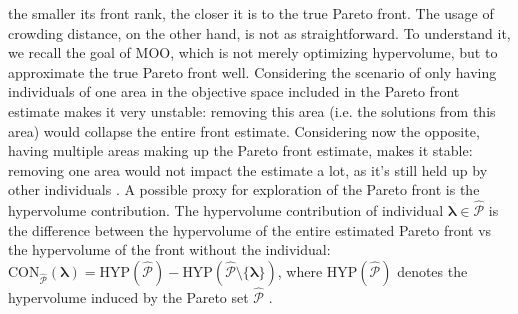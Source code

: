 \documentclass[twoside,11pt]{article}
\begin{document}
the smaller its front rank, the closer it is to the true Pareto front.
The usage of crowding distance, on the other hand, is not as straightforward. To understand it, we recall the goal of MOO, which is not merely optimizing
hypervolume, but to approximate the true Pareto front well.
Considering the scenario of only having individuals of one area in the objective space included in the Pareto front estimate makes it very unstable: removing this
area (i.e. the solutions from this area) would collapse the entire front estimate.
Considering now the opposite, having multiple areas making up the Pareto front estimate, makes it stable: removing one area would not impact the estimate a lot,
as it's still held up by other individuals \citep[p. 185, pp. 189-192]{genetic_algos}.
A possible proxy for exploration of the Pareto front is the hypervolume contribution. The hypervolume contribution of individual
$\boldsymbol\lambda\in\hat{\mathcal{P}}$ is the difference between the hypervolume of the entire estimated Pareto front vs the hypervolume of the front without the
individual: $\text{CON}_{\hat{\mathcal{P}}}(\boldsymbol\lambda)=\text{HYP}(\hat{\mathcal{P}})-\text{HYP}(\hat{\mathcal{P}}\setminus\{\boldsymbol\lambda\})$,
where $\text{HYP}(\hat{\mathcal{P}})$ denotes the hypervolume induced by the Pareto set $\hat{\mathcal{P}}$ \citep[p. 384]{10.5555/1943267.1943271}.


\end{document}
